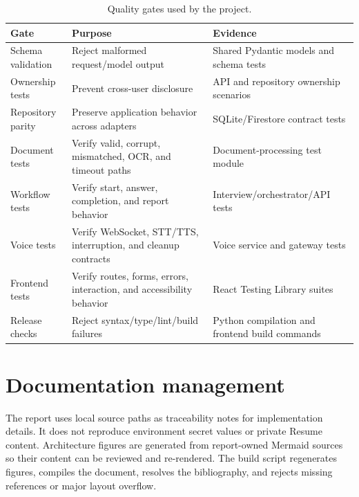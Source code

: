\begin{table}[htbp]\centering
\caption{Quality gates used by the project.}\label{tab:quality-gates}
\begin{tabularx}{\textwidth}{p{}YY}\toprule
Gate & Purpose & Evidence\\ \midrule
Schema validation & Reject malformed request/model output & Shared Pydantic models and schema tests\\
Ownership tests & Prevent cross-user disclosure & API and repository ownership scenarios\\
Repository parity & Preserve application behavior across adapters & SQLite/Firestore contract tests\\
Document tests & Verify valid, corrupt, mismatched, OCR, and timeout paths & Document-processing test module\\
Workflow tests & Verify start, answer, completion, and report behavior & Interview/orchestrator/API tests\\
Voice tests & Verify WebSocket, STT/TTS, interruption, and cleanup contracts & Voice service and gateway tests\\
Frontend tests & Verify routes, forms, errors, interaction, and accessibility behavior & React Testing Library suites\\
Release checks & Reject syntax/type/lint/build failures & Python compilation and frontend build commands\\
\bottomrule\end{tabularx}
\end{table}

\section{Documentation management}

The report uses local source paths as traceability notes for implementation details. It does not reproduce environment secret values or private Resume content. Architecture figures are generated from report-owned Mermaid sources so their content can be reviewed and re-rendered. The build script regenerates figures, compiles the document, resolves the bibliography, and rejects missing references or major layout overflow.


